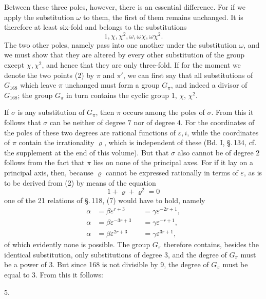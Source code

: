 Between these three poles, however, there is an essential difference. For if we apply the substitution $\omega$ to them, the first of them remains unchanged. It is therefore at least six-fold and belongs to the substitutions
\[
1, \chi, \chi^2, \omega, \omega\chi, \omega\chi^2.
\]
The two other poles, namely
pass into one another under the substitution $\omega$, and we must show that they are altered by every other substitution of the group except $\chi, \chi^2$, and hence that they are only three-fold. If for the moment we denote the two points (2) by $\pi$ and $\pi'$, we can first say that all substitutions of $G_{168}$ which leave $\pi$ unchanged must form a group $G_\pi$,
and indeed a divisor of $G_{168}$; the group $G_\pi$ in turn contains the cyclic group 1, $\chi$, $\chi^2$.

If $\sigma$ is any substitution of $G_\pi$, then $\pi$ occurs among the poles of $\sigma$. From this it follows that $\sigma$ can be neither of degree $7$ nor of degree $4$. For the coordinates of the poles of these two degrees are rational functions of $\varepsilon, i$, while the coordinates of $\pi$ contain the irrationality $\varrho$, which is independent of these (Bd. I, \S.\,134, cf. the supplement at the end of this volume). But that $\sigma$ also cannot be of degree $2$ follows from the fact that $\pi$ lies on none of the principal axes. For if it lay on a principal axis, then, because $\varrho$ cannot be expressed rationally in terms of $\varepsilon$, as is to be derived from (2) by means of the equation
\[
1 + \varrho + \varrho^2 = 0
\]
one of the 21 relations of \S.\,118, (7) would have to hold, namely
\[
\begin{aligned}
\alpha &= \beta\varepsilon^{r+3} &&= \gamma\varepsilon^{-2r+1}, \\
\alpha &= \beta\varepsilon^{-3r+3} &&= \gamma\varepsilon^{-r+1}, \\
\alpha &= \beta\varepsilon^{2r+3} &&= \gamma\varepsilon^{3r+1},
\end{aligned}
\]
of which evidently none is possible. The group $G_\pi$ therefore contains, besides the identical substitution, only substitutions of degree $3$, and the degree of $G_\pi$ must be a power of 3. But since 168 is not divisible by 9, the degree of $G_\pi$ must be equal to 3. From this it follows:

5. 
